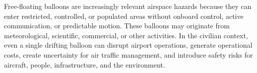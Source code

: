 








Free-floating balloons are increasingly relevant airspace hazards because they can enter restricted, controlled, or populated areas without onboard control, active communication, or predictable motion. These balloons may originate from meteorological, scientific, commercial, or other activities. In the civilian context, even a single drifting balloon can disrupt airport operations, generate operational costs, create uncertainty for air traffic management, and introduce safety risks for aircraft, people, infrastructure, and the environment.
\\


